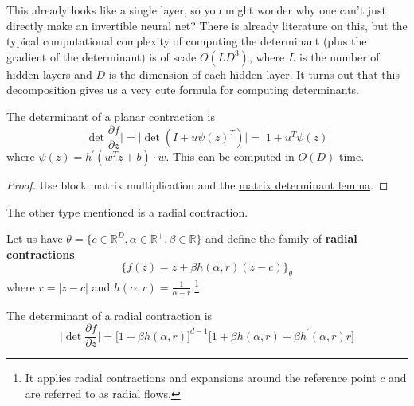 \documentclass{article}
\begin{document}
  This already looks like a single layer, so you might wonder why one can't just directly make an invertible neural net? There is already literature on this, but the typical computational complexity of computing the determinant (plus the gradient of the determinant) is of scale $O(LD^3)$, where $L$ is the number of hidden layers and $D$ is the dimension of each hidden layer. It turns out that this decomposition gives us a very cute formula for computing determinants. 

  \begin{lemma}
    The determinant of a planar contraction is 
    \begin{equation}
      \bigg| \det \frac{\partial f}{\partial z} \bigg| = \big| \det (I + u \psi (z)^T ) \big| = \big| 1 + u^T \psi(z) \big| 
    \end{equation} 
    where $\psi(z) = h^\prime (w^T z + b) \cdot w$. This can be computed in $O(D)$ time. 
  \end{lemma}
  \begin{proof}
    Use block matrix multiplication and the \href{https://en.wikipedia.org/wiki/Matrix_determinant_lemma}{matrix determinant lemma}.
  \end{proof}

  The other type mentioned is a radial contraction. 

  \begin{definition}
    Let us have $\theta = \{ c \in \mathbb{R}^D, \alpha \in \mathbb{R}^+, \beta \in \mathbb{R} \}$ and define the family of \textbf{radial contractions} 
    \begin{equation}
      \{ f(z) = z + \beta h(\alpha, r) (z - c) \}_\theta
    \end{equation}
    where $r = |z - c|$ and $h(\alpha, r) = \frac{1}{\alpha + r}$.\footnote{It applies radial contractions and expansions around the reference point $c$ and are referred to as radial flows. }
  \end{definition}

  \begin{lemma} 
    The determinant of a radial contraction is 
    \begin{equation}
      \bigg| \det \frac{\partial f}{\partial z} \bigg| = \big[ 1 + \beta h(\alpha, r)\big]^{d-1} \big[ 1 + \beta h(\alpha, r) + \beta h^\prime (\alpha, r) r \big]
    \end{equation}
  \end{lemma}
\end{document}
